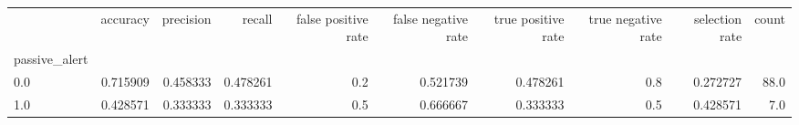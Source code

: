 \begin{tabular}{lrrrrrrrrr}
\toprule
{} &  accuracy &  precision &    recall &  false positive rate &  false negative rate &  true positive rate &  true negative rate &  selection rate &  count \\
passive\_alert &           &            &           &                      &                      &                     &                     &                 &        \\
\midrule
0.0           &  0.715909 &   0.458333 &  0.478261 &                  0.2 &             0.521739 &            0.478261 &                 0.8 &        0.272727 &   88.0 \\
1.0           &  0.428571 &   0.333333 &  0.333333 &                  0.5 &             0.666667 &            0.333333 &                 0.5 &        0.428571 &    7.0 \\
\bottomrule
\end{tabular}
